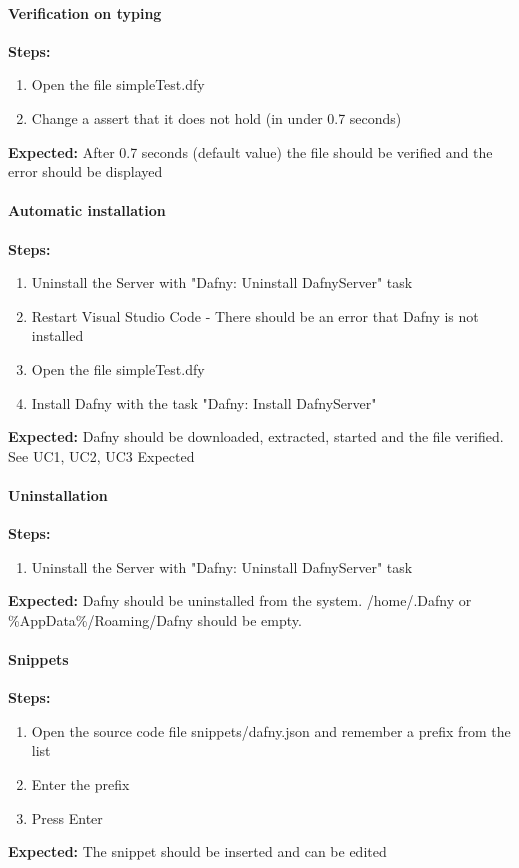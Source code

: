 \paragraph{Verification on typing}
\textbf{\newline Steps:}
\begin{enumerate}
	\item Open the file simpleTest.dfy
	\item Change a assert that it does not hold (in under 0.7 seconds)
\end{enumerate}
\textbf{\newline Expected:}
After 0.7 seconds (default value) the file should be verified and the error should be displayed 

\paragraph{Automatic installation}
\textbf{\newline Steps:}
\begin{enumerate}
\item Uninstall the Server with "Dafny: Uninstall DafnyServer" task
\item Restart Visual Studio Code - There should be an error that Dafny is not installed
\item Open the file simpleTest.dfy
\item Install Dafny with the task "Dafny: Install DafnyServer" 
\end{enumerate}
\textbf{\newline Expected:}
Dafny should be downloaded, extracted, started and the file verified. See UC1, UC2, UC3 Expected


\paragraph{Uninstallation}
\textbf{\newline Steps:}
\begin{enumerate}
	\item Uninstall the Server with "Dafny: Uninstall DafnyServer" task
\end{enumerate}
\textbf{\newline Expected:}
Dafny should be uninstalled from the system. /home/.Dafny or \%AppData\%/Roaming/Dafny should be empty.


\paragraph{Snippets}
\textbf{\newline Steps:}
\begin{enumerate}
	\item Open the source code file snippets/dafny.json and remember a prefix from the list
	\item Enter the prefix 
	\item Press Enter
\end{enumerate}
\textbf{\newline Expected:}
The snippet should be inserted and can be edited


